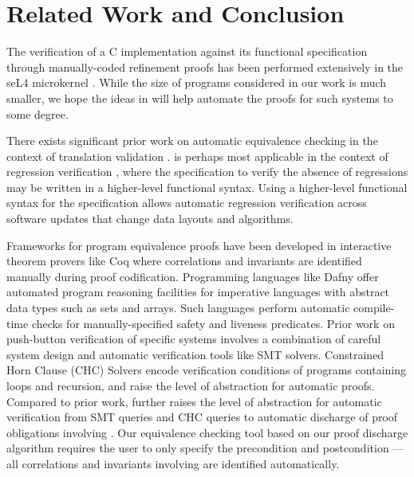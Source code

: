 \section{Related Work and Conclusion}
\label{sec:relwork}
The verification of a C implementation against
its functional specification through manually-coded
refinement proofs has been performed
extensively in the seL4 microkernel \cite{seL4}.
While the size of programs
considered in our work is much smaller,
we hope the ideas in \toolName{} will help
automate the proofs for such systems to some degree.

There exists significant prior work on automatic
equivalence checking in the context of
translation
validation \cite{tvi,tristan_tv_eqsat11,stepp_eqsat_llvm11,eqsat,pec,zuck03,zuck05,heffter05,covac,c_to_verilog,kanade09,lopes16,tvoc_cav05,ddec,semalign,oopsla20,tv_oskernel,namjoshi13}.
\toolName{} is perhaps most applicable in the context of
regression verification \cite{strichman_regressverify,felsing14}, where
the specification to verify the absence of regressions may be written
in a higher-level functional syntax. Using
a higher-level functional syntax for the specification
allows automatic regression verification across software updates
that change
data layouts and algorithms.

Frameworks for program equivalence proofs have been developed
in interactive theorem provers like Coq \cite{programEquivalenceInCoq}
where correlations and invariants are identified manually during
proof codification.
Programming languages like Dafny \cite{dafny} offer automated program
reasoning facilities for imperative languages with
abstract data types such as sets and arrays.
Such languages perform automatic
compile-time checks
for manually-specified safety
and liveness predicates. Prior work on push-button
verification of specific
systems \cite{fscq,hyperkernel,serval,verifiedBPF}
involves a combination
of careful system design and
automatic verification tools like SMT solvers.
Constrained Horn Clause (CHC) Solvers \cite{CHCeq}
encode verification
conditions of programs containing loops and recursion,
and raise the level of abstraction for automatic proofs.
Compared to prior work, \toolName{} further raises the level
of abstraction for automatic verification from
SMT queries and CHC queries to automatic discharge of
proof obligations involving \recursiveRelations{}.
Our equivalence checking tool based on
our proof discharge algorithm requires the user
to only specify the precondition and
postcondition --- all
correlations and invariants involving \recursiveRelations{}
are identified automatically.

